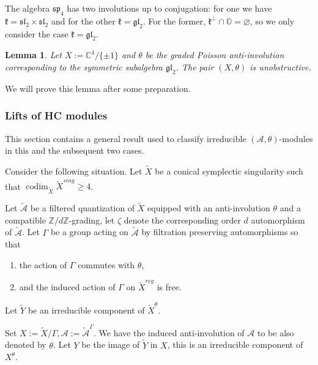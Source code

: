 \documentclass[12pt]{amsart}
\newcommand{\C}{\mathbb{C}}
\newcommand{\A}{\mathcal{A}}
\newcommand{\Orb}{\mathbb{O}}
\newcommand{\Z}{\mathbb{Z}}
\newcommand{\kf}{\mathfrak{k}}
\newtheorem{Lem}[Thm]{Lemma}
\theoremstyle{definition}
\numberwithin{equation}{section}
\begin{document}
The algebra $\mathfrak{sp}_4$ has two involutions up to conjugation:
for one we have $\kf=\mathfrak{sl}_2\times \mathfrak{sl}_2$
and for the other $\kf=\mathfrak{gl}_2$. For the former,
$\kf^\perp\cap \Orb=\varnothing$, so we only consider the case
$\kf=\mathfrak{gl}_2$.

\begin{Lem}\label{Lem:c2_unobstructive}
Let $X:=\C^4/\{\pm 1\}$ and $\theta$ be the graded Poisson anti-involution corresponding to the
symmetric subalgebra $\mathfrak{gl}_2$. The pair $(X,\theta)$ is unobstructive.
\end{Lem}

We will prove this lemma after some preparation.

\subsubsection{Lifts of HC modules}
This section contains a general result used to classify irreducible $(\A,\theta)$-modules
in this and the subsequent two cases.

Consider the following situation. Let $\tilde{X}$ be a conical symplectic singularity
such that $\operatorname{codim}_{\tilde{X}} \tilde{X}^{sing}\geqslant 4$.


Let $\tilde{\A}$ be a filtered
quantization of $\tilde{X}$ equipped with an anti-involution $\theta$ and a compatible $\Z/d\Z$-grading, let
$\zeta$ denote the corresponding order $d$ automorphism of $\tilde{\A}$. Let $\Gamma$ be
a group acting on $\tilde{\A}$ by filtration preserving automorphisms so that
\begin{enumerate}
\item  the action of $\Gamma$ commutes with $\theta$,
\item
and  the induced action of $\Gamma$ on $\tilde{X}^{reg}$
is free.
\end{enumerate}

Let $\tilde{Y}$ be an irreducible component of $\tilde{X}^{\theta}$.

Set $X:=\tilde{X}/\Gamma, \A:=\tilde{\A}^\Gamma$. We have the induced anti-involution
of $\A$ to be also denoted by $\theta$. Let $Y$ be the image of $\tilde{Y}$ in $X$,
this is an irreducible component of $X^\theta$.
\end{document}
